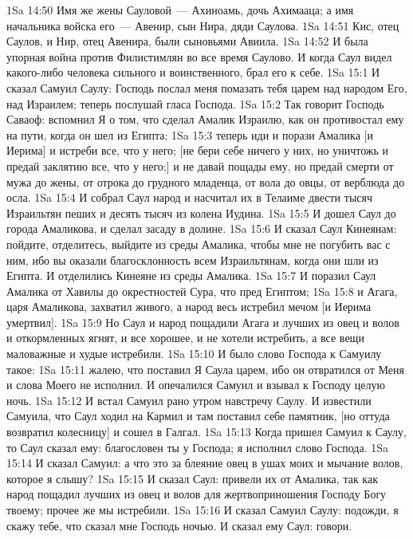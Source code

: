 \vs 1Sa 14:50 Имя же жены Сауловой~--- Ахиноамь, дочь Ахимааца; а имя начальника войска его~--- Авенир, сын Нира, дяди Саулова.
\vs 1Sa 14:51 Кис, отец Саулов, и Нир, отец Авенира, были сыновьями Авиила.
\vs 1Sa 14:52 И была упорная война против Филистимлян во все время Саулово. И когда Саул видел какого-либо человека сильного и воинственного, брал его к себе.
\vs 1Sa 15:1 И сказал Самуил Саулу: Господь послал меня помазать тебя царем над народом Его, над Израилем; теперь послушай гласа Господа.
\vs 1Sa 15:2 Так говорит Господь Саваоф: вспомнил Я о том, что сделал Амалик Израилю, как он противостал ему на пути, когда он шел из Египта;
\vs 1Sa 15:3 теперь иди и порази Амалика [и Иерима] и истреби все, что у него; [не бери себе ничего у них, но уничтожь и предай заклятию все, что у него;] и не давай пощады ему, но предай смерти от мужа до жены, от отрока до грудного младенца, от вола до овцы, от верблюда до осла.
\vs 1Sa 15:4 И собрал Саул народ и насчитал их в Телаиме двести тысяч Израильтян пеших и десять тысяч из колена Иудина.
\vs 1Sa 15:5 И дошел Саул до города Амаликова, и сделал засаду в долине.
\vs 1Sa 15:6 И сказал Саул Кинеянам: пойдите, отделитесь, выйдите из среды Амалика, чтобы мне не погубить вас с ним, ибо вы оказали благосклонность всем Израильтянам, когда они шли из Египта. И отделились Кинеяне из среды Амалика.
\vs 1Sa 15:7 И поразил Саул Амалика от Хавилы до окрестностей Сура, что пред Египтом;
\vs 1Sa 15:8 и Агага, царя Амаликова, захватил живого, а народ весь истребил мечом [и Иерима умертвил].
\vs 1Sa 15:9 Но Саул и народ пощадили Агага и лучших из овец и волов и откормленных ягнят, и все хорошее, и не хотели истребить, а все вещи маловажные и худые истребили.
\rsbpar\vs 1Sa 15:10 И было слово Господа к Самуилу такое:
\vs 1Sa 15:11 жалею, что поставил Я Саула царем, ибо он отвратился от Меня и слова Моего не исполнил. И опечалился Самуил и взывал к Господу целую ночь.
\vs 1Sa 15:12 И встал Самуил рано утром  навстречу Саулу. И известили Самуила, что Саул ходил на Кармил и там поставил себе памятник, [но оттуда возвратил колесницу] и сошел в Галгал.
\vs 1Sa 15:13 Когда пришел Самуил к Саулу, то Саул сказал ему: благословен ты у Господа; я исполнил слово Господа.
\vs 1Sa 15:14 И сказал Самуил: а что это за блеяние овец в ушах моих и мычание волов, которое я слышу?
\vs 1Sa 15:15 И сказал Саул: привели их от Амалика, так как народ пощадил лучших из овец и волов для жертвоприношения Господу Богу твоему; прочее же мы истребили.
\vs 1Sa 15:16 И сказал Самуил Саулу: подожди, я скажу тебе, что сказал мне Господь ночью. И сказал ему Саул: говори.
